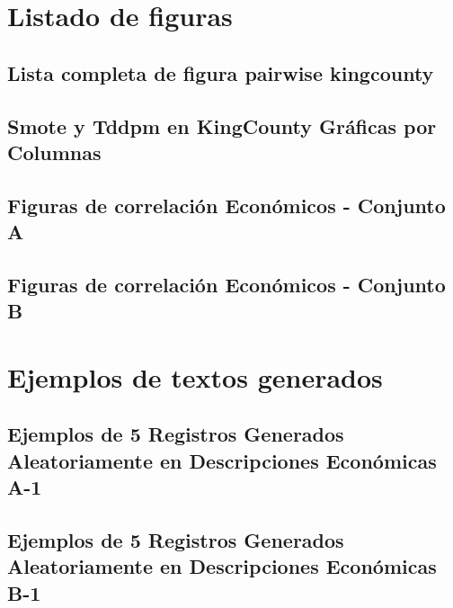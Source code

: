 


\chapter{Listado de figuras}
\section{Lista completa de figura pairwise kingcounty}
\label{A-pairwise-kingcounty-top2-a-1}


\section{Smote y Tddpm en KingCounty Gráficas por Columnas}



\section{Figuras de correlación Económicos - Conjunto A}
\label{pairwise-full-a}



\section{Figuras de correlación Económicos - Conjunto B}
\label{pairwise-full-a}


\chapter{Ejemplos de textos generados}

\section{Ejemplos de 5 Registros Generados Aleatoriamente en Descripciones Económicas A-1}
\label{ejemplo-10-aleatoreos-a}


\section{Ejemplos de 5 Registros Generados Aleatoriamente en Descripciones Económicas B-1}
\label{ejemplo-10-aleatoreos-b}


